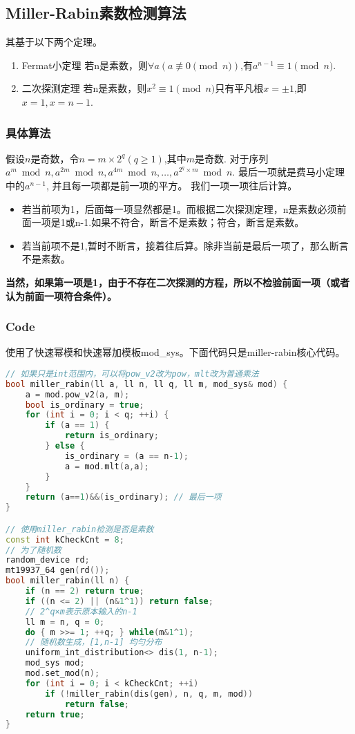 \subsection{Miller-Rabin素数检测算法}
其基于以下两个定理。
\begin{enumerate}
    \item Fermat小定理 若n是素数，则$\forall a(a \not\equiv 0 \pmod{n})$,有$a^{n-1} \equiv 1 \pmod{n}$.
    \item 二次探测定理 若n是素数，则$x^2 \equiv 1 \pmod{n}$只有平凡根$x=\pm1$,即$x=1,x=n-1$.
\end{enumerate}
\subsubsection{具体算法}
假设$n$是奇数，令$n=m \times 2^q (q \geq 1)$,其中$m$是奇数.
对于序列$a^m \bmod n, a^{2m} \bmod n, a^{4m} \bmod n,\ldots,a^{2^q \times m} \bmod n$.
最后一项就是费马小定理中的$a^{n-1}$, 并且每一项都是前一项的平方。
我们一项一项往后计算。
\begin{itemize}
    \item 若当前项为1，后面每一项显然都是1。而根据二次探测定理，n是素数必须前面一项是1或n-1.如果不符合，断言不是素数；符合，断言是素数。
    \item 若当前项不是1,暂时不断言，接着往后算。除非当前是最后一项了，那么断言不是素数。
\end{itemize}
\textbf{当然，如果第一项是1，由于不存在二次探测的方程，所以不检验前面一项（或者认为前面一项符合条件）。}
\subsubsection{Code}
使用了快速幂模和快速幂加模板mod\_sys。下面代码只是miller-rabin核心代码。
\begin{lstlisting}[language={c++}]
// 如果只是int范围内，可以将pow_v2改为pow，mlt改为普通乘法
bool miller_rabin(ll a, ll n, ll q, ll m, mod_sys& mod) {
    a = mod.pow_v2(a, m);
    bool is_ordinary = true;
    for (int i = 0; i < q; ++i) {
        if (a == 1) {
            return is_ordinary;
        } else {
            is_ordinary = (a == n-1);
            a = mod.mlt(a,a);
        }
    }
    return (a==1)&&(is_ordinary); // 最后一项
}

// 使用miller_rabin检测是否是素数
const int kCheckCnt = 8;
// 为了随机数
random_device rd;
mt19937_64 gen(rd());
bool miller_rabin(ll n) {
    if (n == 2) return true;
    if ((n <= 2) || (n&1^1)) return false;
    // 2^q×m表示原本输入的n-1
    ll m = n, q = 0;
    do { m >>= 1; ++q; } while(m&1^1);
    // 随机数生成，[1,n-1] 均匀分布
    uniform_int_distribution<> dis(1, n-1);
    mod_sys mod;
    mod.set_mod(n);
    for (int i = 0; i < kCheckCnt; ++i)
        if (!miller_rabin(dis(gen), n, q, m, mod))
            return false;
    return true;
}
\end{lstlisting}
